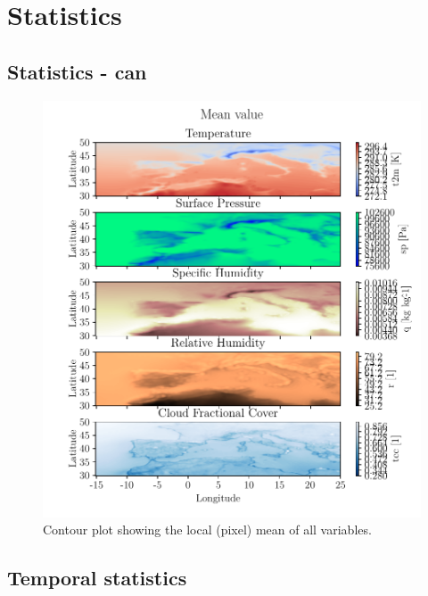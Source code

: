 \appendix
\chapter{Statistics} \label{ch:appendix_statistic}
\section{Statistics - can }
\begin{figure}[ht]
    \centering
    \includegraphics{python_figs/contourplot_all_variables_mean.pdf}
    \caption{Contour plot showing the local (pixel) mean of all variables.}
    \label{fig:contour_mean_all_vars}
\end{figure}

\section{Temporal statistics} \label{sec:all_stats}

